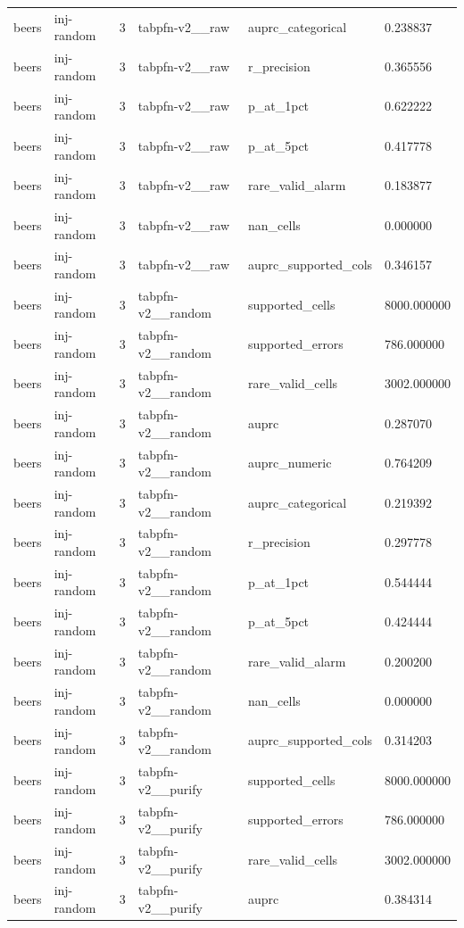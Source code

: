 \begin{tabular}{llllll}
beers & inj-random & 3 & tabpfn-v2\_\_raw & auprc\_categorical & 0.238837 \\
beers & inj-random & 3 & tabpfn-v2\_\_raw & r\_precision & 0.365556 \\
beers & inj-random & 3 & tabpfn-v2\_\_raw & p\_at\_1pct & 0.622222 \\
beers & inj-random & 3 & tabpfn-v2\_\_raw & p\_at\_5pct & 0.417778 \\
beers & inj-random & 3 & tabpfn-v2\_\_raw & rare\_valid\_alarm & 0.183877 \\
beers & inj-random & 3 & tabpfn-v2\_\_raw & nan\_cells & 0.000000 \\
beers & inj-random & 3 & tabpfn-v2\_\_raw & auprc\_supported\_cols & 0.346157 \\
beers & inj-random & 3 & tabpfn-v2\_\_random & supported\_cells & 8000.000000 \\
beers & inj-random & 3 & tabpfn-v2\_\_random & supported\_errors & 786.000000 \\
beers & inj-random & 3 & tabpfn-v2\_\_random & rare\_valid\_cells & 3002.000000 \\
beers & inj-random & 3 & tabpfn-v2\_\_random & auprc & 0.287070 \\
beers & inj-random & 3 & tabpfn-v2\_\_random & auprc\_numeric & 0.764209 \\
beers & inj-random & 3 & tabpfn-v2\_\_random & auprc\_categorical & 0.219392 \\
beers & inj-random & 3 & tabpfn-v2\_\_random & r\_precision & 0.297778 \\
beers & inj-random & 3 & tabpfn-v2\_\_random & p\_at\_1pct & 0.544444 \\
beers & inj-random & 3 & tabpfn-v2\_\_random & p\_at\_5pct & 0.424444 \\
beers & inj-random & 3 & tabpfn-v2\_\_random & rare\_valid\_alarm & 0.200200 \\
beers & inj-random & 3 & tabpfn-v2\_\_random & nan\_cells & 0.000000 \\
beers & inj-random & 3 & tabpfn-v2\_\_random & auprc\_supported\_cols & 0.314203 \\
beers & inj-random & 3 & tabpfn-v2\_\_purify & supported\_cells & 8000.000000 \\
beers & inj-random & 3 & tabpfn-v2\_\_purify & supported\_errors & 786.000000 \\
beers & inj-random & 3 & tabpfn-v2\_\_purify & rare\_valid\_cells & 3002.000000 \\
beers & inj-random & 3 & tabpfn-v2\_\_purify & auprc & 0.384314 \\

\end{tabular}
